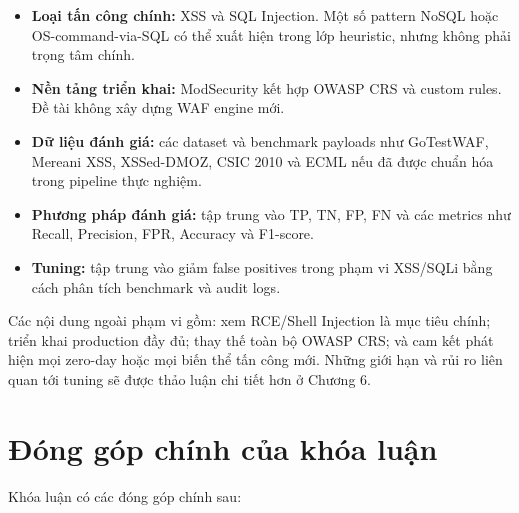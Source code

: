 \begin{itemize}
    \item \textbf{Loại tấn công chính:} XSS và SQL Injection. Một số pattern NoSQL hoặc OS-command-via-SQL có thể xuất hiện trong lớp heuristic, nhưng không phải trọng tâm chính.

    \item \textbf{Nền tảng triển khai:} ModSecurity kết hợp OWASP CRS và custom rules. Đề tài không xây dựng WAF engine mới.

    \item \textbf{Dữ liệu đánh giá:} các dataset và benchmark payloads như GoTestWAF, Mereani XSS, XSSed-DMOZ, CSIC 2010 và ECML nếu đã được chuẩn hóa trong pipeline thực nghiệm.

    \item \textbf{Phương pháp đánh giá:} tập trung vào TP, TN, FP, FN và các metrics như Recall, Precision, FPR, Accuracy và F1-score.

    \item \textbf{Tuning:} tập trung vào giảm false positives trong phạm vi XSS/SQLi bằng cách phân tích benchmark và audit logs.
\end{itemize}

Các nội dung ngoài phạm vi gồm: xem RCE/Shell Injection là mục tiêu chính; triển khai production đầy đủ; thay thế toàn bộ OWASP CRS; và cam kết phát hiện mọi zero-day hoặc mọi biến thể tấn công mới. Những giới hạn và rủi ro liên quan tới tuning sẽ được thảo luận chi tiết hơn ở Chương 6.

\section{Đóng góp chính của khóa luận}
\label{sec:contributions}

Khóa luận có các đóng góp chính sau:


